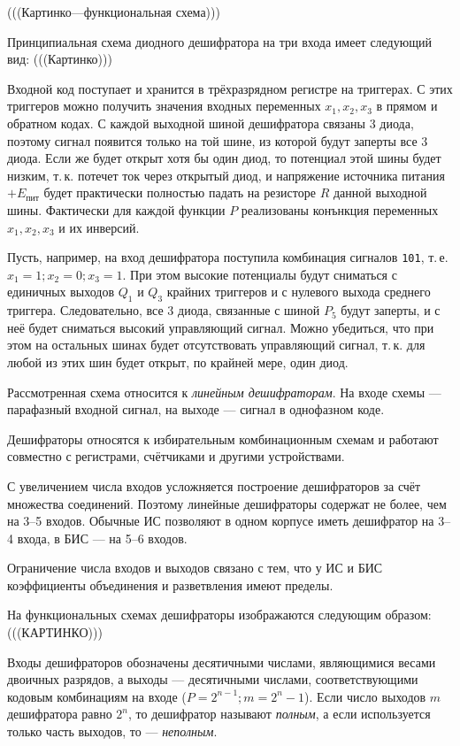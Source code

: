 \documentclass[10pt,a4paper,titlepage]{article}
\begin{document}
(((Картинко---функциональная схема)))

Принципиальная схема диодного дешифратора на три входа имеет следующий вид: (((Картинко)))

Входной код поступает и хранится в трёхразрядном регистре на триггерах.
С этих триггеров можно получить значения входных переменных $x_1, x_2, x_3$ в прямом и обратном кодах.
С каждой выходной шиной дешифратора связаны 3 диода, поэтому сигнал появится только на той шине, из которой будут заперты все 3 диода.
Если же будет открыт хотя бы один диод, то потенциал этой шины будет низким, т.\,к. потечет ток через открытый диод, и напряжение источника питания $+E_{пит}$ будет практически полностью падать на резисторе $R$ данной выходной шины.
Фактически для каждой функции $P$ реализованы конънкция переменных $x_1, x_2, x_3$ и их инверсий.

Пусть, например, на вход дешифратора поступила комбинация сигналов \texttt{101}, т.\,е. $x_1=1; x_2=0;x_3=1$.
При этом высокие потенциалы будут сниматься с единичных выходов $Q_1$ и $Q_3$ крайних триггеров и с нулевого выхода среднего триггера.
Следовательно, все 3 диода, связанные с шиной $P_5$ будут заперты, и с неё будет сниматься высокий управляющий сигнал.
Можно убедиться, что при этом на остальных шинах будет отсутствовать управляющий сигнал, т.\,к. для любой из этих шин будет открыт, по крайней мере, один диод.

Рассмотренная схема относится к \textit{линейным дешифраторам}.
На входе схемы --- парафазный входной сигнал, на выходе --- сигнал в однофазном коде.

Дешифраторы относятся к избирательным комбинационным схемам и работают совместно с регистрами, счётчиками и другими устройствами.

С увеличением числа входов усложняется построение дешифраторов за счёт множества соединений.
Поэтому линейные дешифраторы содержат не более, чем на 3--5 входов.
Обычные ИС позволяют в одном корпусе иметь дешифратор на 3--4 входа, в БИС --- на 5--6 входов.

Ограничение числа входов и выходов связано с тем, что у ИС и БИС коэффициенты объединения и разветвления имеют пределы.

На функциональных схемах дешифраторы изображаются следующим образом:(((КАРТИНКО)))

Входы дешифраторов обозначены десятичными числами, являющимися весами двоичных разрядов, а выходы --- десятичными числами, соответствующими кодовым комбинациям на входе ($P=2^{n-1}; m=2^n-1$).
Если число выходов $m$ дешифратора равно $2^n$, то дешифратор называют \textit{полным}, а если используется только часть выходов, то --- \textit{неполным}.
\end{document}
